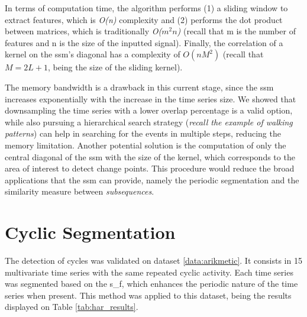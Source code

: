 \par
In terms of computation time, the algorithm performs (1) a sliding window to extract features, which is \textit{O(n)} complexity and (2) performs the dot product between matrices, which is traditionally \textit{O($m^2n$)} (recall that m is the number of features and n is the size of the inputted signal). Finally, the correlation of a kernel on the \gls{ssm}'s diagonal has a complexity of $O(nM^2)$ (recall that $M=2L+1$, being the size of the sliding kernel).
\par
The memory bandwidth is a drawback in this current stage, since the \gls{ssm} increases exponentially with the increase in the time series size. We showed that downsampling the time series with a lower overlap percentage is a valid option, while also pursuing a hierarchical search strategy (\textit{recall the example of walking patterns}) can help in searching for the events in multiple steps, reducing the memory limitation. Another potential solution is the computation of only the central diagonal of the \gls{ssm} with the size of the kernel, which corresponds to the area of interest to detect change points. This procedure would reduce the broad applications that the \gls{ssm} can provide, namely the periodic segmentation and the similarity measure between \textit{subsequences}.

\section{Cyclic Segmentation}

The detection of cycles was validated on dataset \ref{data:arikmetic}. It consists in 15 multivariate time series with the same repeated cyclic activity. Each time series was segmented based on the \gls{s_f}, which enhances the periodic nature of the time series when present. This method was applied to this dataset, being the results displayed on Table \ref{tab:har_results}.



